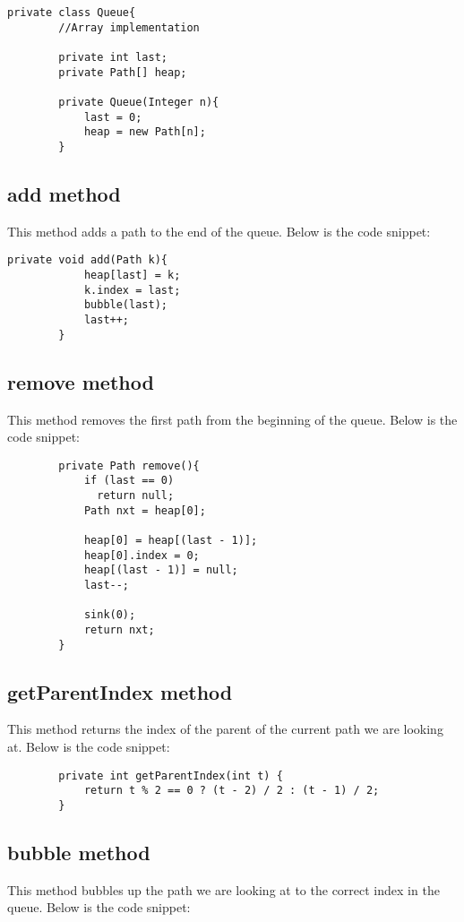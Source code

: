 \documentclass[a4paper,11pt]{article}
\begin{document}
\begin{verbatim}
private class Queue{
        //Array implementation

        private int last;
        private Path[] heap;

        private Queue(Integer n){
            last = 0;
            heap = new Path[n];
        }
\end{verbatim}

\subsection*{add method}
This method adds a path to the end of the queue. Below is the code snippet:

\begin{verbatim}
private void add(Path k){
            heap[last] = k;
            k.index = last;
            bubble(last);
            last++;
        }
\end{verbatim}

\subsection*{remove method}
This method removes the first path from the beginning of the queue. Below is the code snippet:

\begin{verbatim}
        private Path remove(){
            if (last == 0)
              return null;
            Path nxt = heap[0];

            heap[0] = heap[(last - 1)];
            heap[0].index = 0;
            heap[(last - 1)] = null;
            last--;

            sink(0);
            return nxt;
        }
\end{verbatim}

\subsection*{getParentIndex method}
This method returns the index of the parent of the current path we are looking at. Below is the code snippet:

\begin{verbatim}
        private int getParentIndex(int t) {
            return t % 2 == 0 ? (t - 2) / 2 : (t - 1) / 2;
        }
\end{verbatim}

\subsection*{bubble method}
This method bubbles up the path we are looking at to the correct index in the queue. Below is the code snippet:
\end{document}
